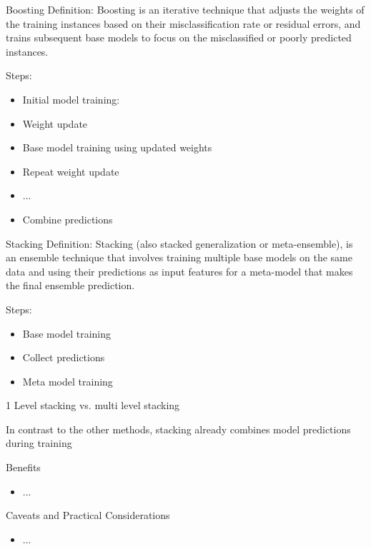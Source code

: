\documentclass[11pt,compress,t,notes=noshow, aspectratio=169, xcolor=table]{beamer}
\begin{document}

\begin{vbframe}{Boosting}
Definition: Boosting is an iterative technique that adjusts the weights of the training instances based on their misclassification rate or residual errors, and trains subsequent base models to focus on the misclassified or poorly predicted instances.

Steps:

\begin{itemize}
\item Initial model training:
\item Weight update
\item Base model training using updated weights
\item Repeat weight update
\item ...
\item Combine predictions
\end{itemize}
\end{vbframe}


\begin{vbframe}{Stacking}
Definition: Stacking (also stacked generalization or meta-ensemble), is an ensemble technique that involves training multiple base models on the same data and using their predictions as input features for a meta-model that makes the final ensemble prediction.

Steps:

\begin{itemize}
\item Base model training
\item Collect predictions
\item Meta model training
\end{itemize}

1 Level stacking vs. multi level stacking

In contrast to the other methods, stacking already combines model predictions during training

\end{vbframe}


\begin{vbframe}{Benefits}

\begin{itemize}
  \item ...
\end{itemize}

\end{vbframe}


\begin{vbframe}{Caveats and Practical Considerations}

\begin{itemize}
  \item ...
\end{itemize}

\end{vbframe}



\endlecture
\end{document}
